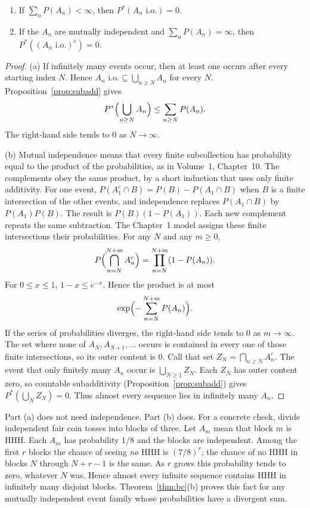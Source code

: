 \begin{theorem}\label{thm:bc}
\begin{enumerate}[label=(\alph*)]
\item If $\sum_n P(A_n)<\infty$, then $P^*(A_n\text{ i.o.})=0$.
\item If the $A_n$ are mutually independent and $\sum_n P(A_n)=\infty$, then $P^*( (A_n\text{ i.o.})^c )=0$.
\end{enumerate}
\end{theorem}
\begin{proof}
(a) If infinitely many events occur, then at least one occurs after every starting index $N$. Hence $A_n\text{ i.o.}\subseteq\bigcup_{n\ge N}A_n$ for every $N$. Proposition~\ref{prop:subadd} gives
\[
 P^*\Bigl(\bigcup_{n\ge N}A_n\Bigr)\le\sum_{n\ge N}P(A_n).
\]
The right-hand side tends to $0$ as $N\to\infty$.

(b) Mutual independence means that every finite subcollection has probability equal to the product of the probabilities, as in Volume~1, Chapter~10. The complements obey the same product, by a short induction that uses only finite additivity. For one event, $P(A_1^c\cap B)=P(B)-P(A_1\cap B)$ when $B$ is a finite intersection of the other events, and independence replaces $P(A_1\cap B)$ by $P(A_1)P(B)$. The result is $P(B)(1-P(A_1))$. Each new complement repeats the same subtraction. The Chapter~1 model assigns these finite intersections their probabilities. For any $N$ and any $m\ge0$,
\[
 P\Bigl(\bigcap_{n=N}^{N+m}A_n^c\Bigr)=\prod_{n=N}^{N+m}(1-P(A_n)).
\]
For $0\le x\le1$, $1-x\le e^{-x}$. Hence the product is at most
\[
 \exp\Bigl(-\sum_{n=N}^{N+m}P(A_n)\Bigr).
\]
If the series of probabilities diverges, the right-hand side tends to $0$ as $m\to\infty$. The set where none of $A_N,A_{N+1},\ldots$ occurs is contained in every one of those finite intersections, so its outer content is $0$. Call that set $Z_N=\bigcap_{n\ge N}A_n^c$. The event that only finitely many $A_n$ occur is $\bigcup_{N\ge1}Z_N$. Each $Z_N$ has outer content zero, so countable subadditivity (Proposition~\ref{prop:subadd}) gives $P^*(\bigcup_NZ_N)=0$. Thus almost every sequence lies in infinitely many $A_n$.
\end{proof}

Part (a) does not need independence. Part (b) does. For a concrete check, divide independent fair coin tosses into blocks of three. Let $A_m$ mean that block $m$ is HHH. Each $A_m$ has probability $1/8$ and the blocks are independent. Among the first $r$ blocks the chance of seeing \emph{no} HHH is $(7/8)^r$; the chance of no HHH in blocks $N$ through $N+r-1$ is the same. As $r$ grows this probability tends to zero, whatever $N$ was. Hence almost every infinite sequence contains HHH in infinitely many disjoint blocks. Theorem~\ref{thm:bc}(b) proves this fact for any mutually independent event family whose probabilities have a divergent sum.

